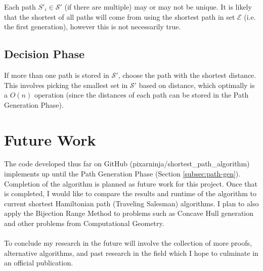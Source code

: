 \documentclass[12pt]{article}
\begin{document}
Each path $S'_i \in \mathcal{S}'$ (if there are multiple) may or may not be unique.
It is likely that the shortest of all paths will come from using the shortest path in set
$\mathcal{E}$ (i.e. the first generation), however this is not necessarily true.

\subsection{Decision Phase}\label{subsec:decision}
If more than one path is stored in $\mathcal{S}'$, choose the path with the
shortest distance.
This involves picking the smallest set in $\mathcal{S}'$ based on distance,
which optimally is a $O(n)$ operation (since the distances of each path can be stored
in the Path Generation Phase).

\section{Future Work}\label{sec:future}
The code developed thus far on GitHub (pixarninja/shortest\_path\_algorithm)
implements up until the Path Generation Phase
(Section \ref{subsec:path-gen}).
Completion of the algorithm is planned as future work for this project.
Once that is completed, I would like to compare the results and runtime
of the algorithm to current
shortest Hamiltonian path (Traveling Salesman) algorithms. I plan to also apply the
Bijection Range Method to problems such as Concave Hull generation and other problems
from Computational Geometry.
\\\\
To conclude my research in the future will involve the collection of more proofs,
alternative algorithms, and past research in the field which I hope to culminate in
an official publication.
\end{document}
